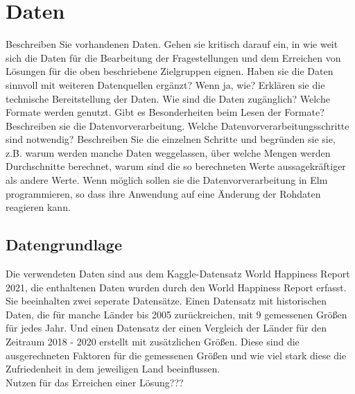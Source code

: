 \section{Daten}
Beschreiben Sie vorhandenen Daten. Gehen sie kritisch darauf ein, in wie weit sich die Daten für die Bearbeitung der Fragestellungen und dem Erreichen von Lösungen für die oben beschriebene Zielgruppen eignen. Haben sie die Daten sinnvoll mit weiteren Datenquellen ergänzt? Wenn ja, wie?
Erklären sie die technische Bereitstellung der Daten.
Wie sind die Daten zugänglich? Welche Formate werden genutzt. Gibt es Besonderheiten beim Lesen der Formate?
Beschreiben sie die Datenvorverarbeitung.
Welche Datenvorverarbeitungsschritte sind notwendig? Beschreiben Sie die einzelnen Schritte und begründen sie sie, z.B. warum werden manche Daten weggelassen, über welche Mengen werden Durchschnitte berechnet, warum sind die so berechneten Werte aussagekräftiger als andere Werte. Wenn möglich sollen sie die Datenvorverarbeitung in Elm programmieren, so dass ihre Anwendung auf eine Änderung der Rohdaten reagieren kann.  \\

\subsection{Datengrundlage}

Die verwendeten Daten sind aus dem Kaggle-Datensatz World Happiness Report 2021, die enthaltenen Daten wurden durch den World Happiness Report erfasst. Sie beeinhalten zwei seperate Datensätze. Einen Datensatz mit historischen Daten, die für manche Länder bis 2005 zurückreichen, mit 9 gemessenen Größen für jedes Jahr. Und einen Datensatz der einen Vergleich der Länder für den Zeitraum 2018 - 2020 erstellt mit zusätzlichen Größen. Diese sind die ausgerechneten Faktoren für die gemessenen Größen und wie viel stark diese die Zufriedenheit in dem jeweiligen Land beeinflussen. \\

Nutzen für das Erreichen einer Lösung???

